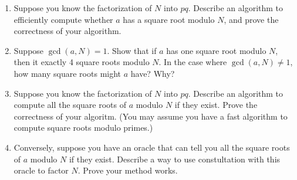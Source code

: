 \documentclass[11pt]{article}
\begin{document}
\begin{enumerate}
{\begin{enumerate}
    \item{
    Suppose you know the factorization of $N$ into $pq$.  Describe an algorithm to efficiently compute whether $a$ has a square root modulo $N$, and prove the correctness of your algorithm.
    }
    \item{
    Suppose $\gcd(a,N)=1$.  Show that if $a$ has one square root modulo $N$, then it exactly 4 square roots modulo $N$.  In the case where $\gcd(a,N)\not=1$, how many square roots might $a$ have? Why?
    }
    \item{
    Suppose you know the factorization of $N$ into $pq$.  Describe an algorithm to compute all the square roots of $a$ modulo $N$ if they exist.  Prove the correctness of your algoritm.  (You may assume you have a fast algorithm to compute square roots modulo primes.)
    }
    \item{
    Conversely, suppose you have an oracle that can tell you all the square roots of $a$ modulo $N$ if they exist.  Describe a way to use constultation with this oracle to factor $N$.  Prove your method works.
    }
  \end{enumerate}
}
\end{enumerate}
\end{document}
